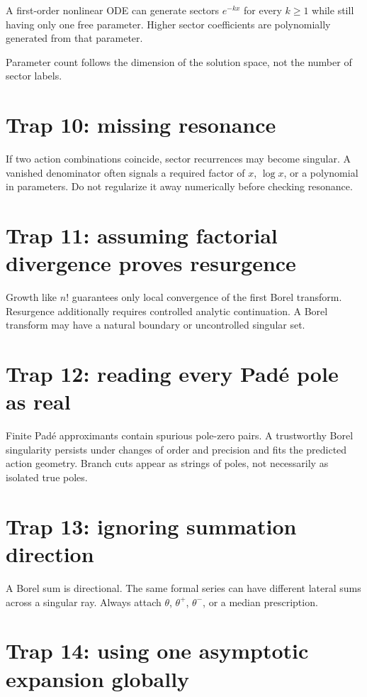\documentclass[11pt,openany]{book}
\theoremstyle{definition}
\theoremstyle{plain}
\theoremstyle{remark}
\begin{document}
A first-order nonlinear ODE can generate sectors $e^{-kx}$ for every $k\ge1$ while still having only one free parameter. Higher sector coefficients are polynomially generated from that parameter.

Parameter count follows the dimension of the solution space, not the number of sector labels.

\section{Trap 10: missing resonance}

If two action combinations coincide, sector recurrences may become singular. A vanished denominator often signals a required factor of $x$, $\log x$, or a polynomial in parameters. Do not regularize it away numerically before checking resonance.

\section{Trap 11: assuming factorial divergence proves resurgence}

Growth like $n!$ guarantees only local convergence of the first Borel transform. Resurgence additionally requires controlled analytic continuation. A Borel transform may have a natural boundary or uncontrolled singular set.

\section{Trap 12: reading every Pad\'e pole as real}

Finite Pad\'e approximants contain spurious pole-zero pairs. A trustworthy Borel singularity persists under changes of order and precision and fits the predicted action geometry. Branch cuts appear as strings of poles, not necessarily as isolated true poles.

\section{Trap 13: ignoring summation direction}

A Borel sum is directional. The same formal series can have different lateral sums across a singular ray. Always attach $\theta$, $\theta^+$, $\theta^-$, or a median prescription.

\section{Trap 14: using one asymptotic expansion globally}
\end{document}
